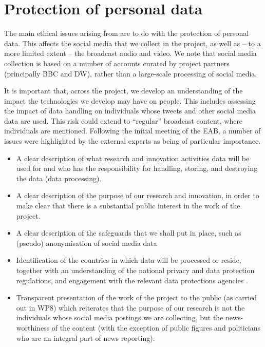 \section{Protection of personal data}
\label{sec:personal}

The main ethical issues arising from \project are to do with the protection of personal data.  This affects the social media that we collect in the project, as well as -- to a more limited extent --  the broadcast audio and video.  We note that social media collection is based on a number of accounts curated by project partners (principally BBC and DW), rather than a large-scale processing of social media.

It is important that, across the project,  we develop an understanding of the impact the technologies we develop may have on people.  This includes assessing the impact of \project data handling on individuals whose tweets and other social media data are used. This risk could extend to ``regular'' broadcast content, where individuals are mentioned.  Following the initial meeting of the EAB, a number of issues were highlighted by the external experts as being of particular importance.
\begin{itemize}
\item A clear description of what research and innovation activities \project data will be used for and who has the responsibility for handling, storing, and destroying the data (data processing).
\item A clear description of the purpose of our research and innovation, in order to make clear that there is a substantial public interest in the  work of the project.
\item A clear description of the safeguards that we shall put in place, such as (pseudo) anonymisation of social media data
\item Identification of the countries in which data will be processed or reside, together with an understanding of the national privacy and data protection regulations, and engagement with the relevant data protections agencies .
\item Transparent presentation of the work of the project to the public (as carried out in WP8) which reiterates that the purpose of our research is not the individuals whose social media postings we are collecting, but the news-worthiness of the content (with the exception of public figures and politicians who are an integral part of news reporting).
\end{itemize}


